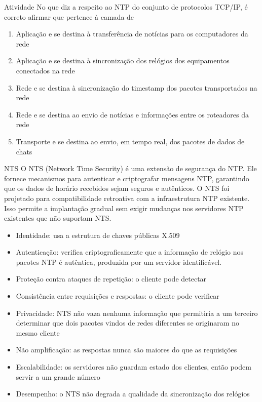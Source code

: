 \documentclass{if-beamer}
\begin{document}
		\begin{frame}
		\begin{block}{Atividade}
		No que diz a respeito ao NTP do conjunto de protocolos TCP/IP, é correto afirmar que pertence à camada de

		
		\begin{enumerate}
			\item Aplicação e se destina à transferência de notícias para os computadores da rede
			\item Aplicação e se destina à sincronização dos relógios dos equipamentos conectados na rede
			\item Rede e se destina à sincronização do timestamp dos pacotes transportados na rede
			\item Rede e se destina ao envio de notícias e informações entre os roteadores da rede
			\item Transporte e se destina ao envio, em tempo real, dos pacotes de dados de chats
		
		\end{enumerate}
		
		\end{block}
		\end{frame}
		\begin{frame}[allowframebreaks]{NTS}
		O NTS (Network Time Security) é uma extensão de segurança do NTP. Ele fornece mecanismos para autenticar e criptografar mensagens NTP, garantindo que os dados de horário recebidos sejam seguros e autênticos. O NTS foi projetado para compatibilidade retroativa com a infraestrutura NTP existente. Isso permite a implantação gradual sem exigir mudanças nos servidores NTP existentes que não suportam NTS. 
		\framebreak
		\begin{itemize}
			\item Identidade: usa a estrutura de chaves públicas X.509
			\item Autenticação: verifica criptograficamente que a informação de relógio nos
	pacotes NTP é autêntica, produzida por um servidor identificável.
	\item Proteção contra ataques de repetição: o cliente pode detectar
	\item Consistência entre requisições e respostas: o cliente pode verificar
	\end{itemize}
	\framebreak
	\begin{itemize}
	\item Privacidade: NTS não vaza nenhuma informação que permitiria a um terceiro
	determinar que dois pacotes vindos de redes diferentes se originaram no mesmo
	cliente
	\item Não amplificação: as respostas nunca são maiores do que as requisições
	\item Escalabilidade: os servidores não guardam estado dos clientes, então podem
	servir a um grande número
	\item Desempenho: o NTS não degrada a qualidade da sincronização dos relógios
	\end{itemize}
		\end{frame}
		
\end{document}
